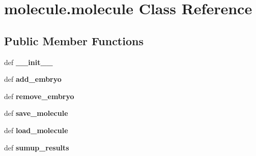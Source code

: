 \hypertarget{classmolecule_1_1molecule}{\section{molecule.\+molecule Class Reference}
\label{classmolecule_1_1molecule}
}
\subsection*{Public Member Functions}
\begin{DoxyCompactItemize}
\item 
\hypertarget{classmolecule_1_1molecule_a6ab0eb481e397971fd9be5fae8254058}{def {\bfseries \+\_\+\+\_\+init\+\_\+\+\_\+}}\label{classmolecule_1_1molecule_a6ab0eb481e397971fd9be5fae8254058}

\item 
\hypertarget{classmolecule_1_1molecule_a13d8cf866d50513a01855f15327752a4}{def {\bfseries add\+\_\+embryo}}\label{classmolecule_1_1molecule_a13d8cf866d50513a01855f15327752a4}

\item 
\hypertarget{classmolecule_1_1molecule_aa0161c35032bb46571e050ee8b1c7c0e}{def {\bfseries remove\+\_\+embryo}}\label{classmolecule_1_1molecule_aa0161c35032bb46571e050ee8b1c7c0e}

\item 
\hypertarget{classmolecule_1_1molecule_abc1b60549fbfe35caa70a8178d1fb337}{def {\bfseries save\+\_\+molecule}}\label{classmolecule_1_1molecule_abc1b60549fbfe35caa70a8178d1fb337}

\item 
\hypertarget{classmolecule_1_1molecule_a134fa06ba99aa732bc3b6fafcedbe824}{def {\bfseries load\+\_\+molecule}}\label{classmolecule_1_1molecule_a134fa06ba99aa732bc3b6fafcedbe824}

\item 
\hypertarget{classmolecule_1_1molecule_a0f08deb008dfcb9bfaa9b999bced444b}{def {\bfseries sumup\+\_\+results}}\label{classmolecule_1_1molecule_a0f08deb008dfcb9bfaa9b999bced444b}

\end{DoxyCompactItemize}
